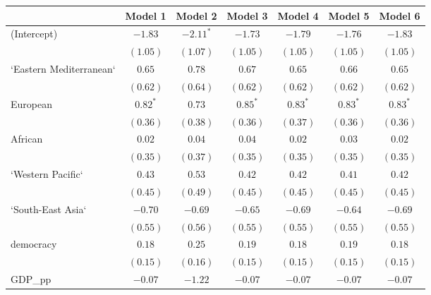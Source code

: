 
\begin{table}[!h]
\begin{center}
\begin{tabular}{l c c c c c c }
\toprule
 & Model 1 & Model 2 & Model 3 & Model 4 & Model 5 & Model 6 \\
\midrule
(Intercept)             & $-1.83$      & $-2.11^{*}$  & $-1.73$      & $-1.79$      & $-1.76$      & $-1.83$      \\
                        & $(1.05)$     & $(1.07)$     & $(1.05)$     & $(1.05)$     & $(1.05)$     & $(1.05)$     \\
`Eastern Mediterranean` & $0.65$       & $0.78$       & $0.67$       & $0.65$       & $0.66$       & $0.65$       \\
                        & $(0.62)$     & $(0.64)$     & $(0.62)$     & $(0.62)$     & $(0.62)$     & $(0.62)$     \\
European                & $0.82^{*}$   & $0.73$       & $0.85^{*}$   & $0.83^{*}$   & $0.83^{*}$   & $0.83^{*}$   \\
                        & $(0.36)$     & $(0.38)$     & $(0.36)$     & $(0.37)$     & $(0.36)$     & $(0.36)$     \\
African                 & $0.02$       & $0.04$       & $0.04$       & $0.02$       & $0.03$       & $0.02$       \\
                        & $(0.35)$     & $(0.37)$     & $(0.35)$     & $(0.35)$     & $(0.35)$     & $(0.35)$     \\
`Western Pacific`       & $0.43$       & $0.53$       & $0.42$       & $0.42$       & $0.41$       & $0.42$       \\
                        & $(0.45)$     & $(0.49)$     & $(0.45)$     & $(0.45)$     & $(0.45)$     & $(0.45)$     \\
`South-East Asia`       & $-0.70$      & $-0.69$      & $-0.65$      & $-0.69$      & $-0.64$      & $-0.69$      \\
                        & $(0.55)$     & $(0.56)$     & $(0.55)$     & $(0.55)$     & $(0.55)$     & $(0.55)$     \\
democracy               & $0.18$       & $0.25$       & $0.19$       & $0.18$       & $0.19$       & $0.18$       \\
                        & $(0.15)$     & $(0.16)$     & $(0.15)$     & $(0.15)$     & $(0.15)$     & $(0.15)$     \\
GDP\_pp                 & $-0.07$      & $-1.22$      & $-0.07$      & $-0.07$      & $-0.07$      & $-0.07$      \\

\end{tabular}
\end{center}
\end{table}
